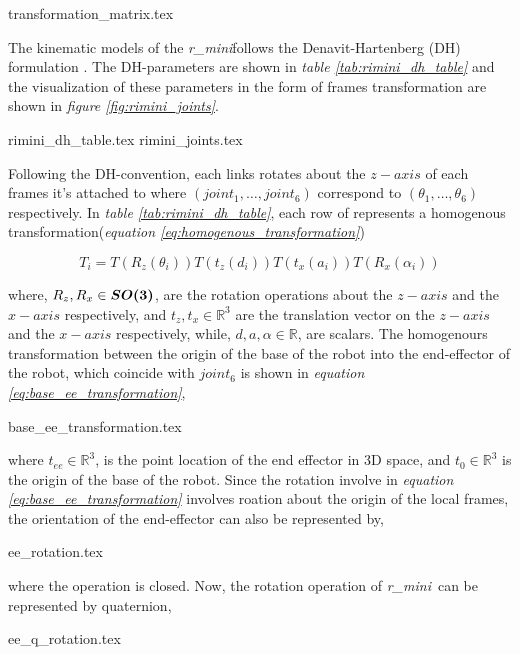 \documentclass[a4paper, 10pt]{article}
\newcommand\thisPaperDir{/home/asl/version-control/ws_thesis/writing_papers/resampling_planning_in_dynamic_environment}
\numberwithin{equation}{section} %
\newcommand\rimini[0]{\textit{r\_mini}} %
\begin{document}
{transformation_matrix.tex}

The kinematic models of the \rimini follows the Denavit-Hartenberg (DH) 
formulation \parencite{Denavit1955}. The DH-parameters are shown 
in \textit{table \ref{tab:rimini_dh_table}} and the visualization of these
parameters in the form of frames transformation are shown in 
\textit{figure \ref{fig:rimini_joints}}.

{rimini_dh_table.tex}
{rimini_joints.tex}

Following the DH-convention, each links rotates about the $z-axis$ of
each frames it's attached to where $(joint_1, \ldots, joint_6)$
correspond to $(\theta_1, \ldots, \theta_6)$ respectively.
In
\textit{table \ref{tab:rimini_dh_table}}, each row of 
represents a homogenous transformation(\textit{equation \ref{eq:homogenous_transformation}})

\begin{equation}\label{eq:homogenous_transformation}
  T_i = T(R_{z}(\theta_i))T(t_{z}(d_i)) T(t_{x}(a_i)) T(R_{x}(\alpha_i))
\end{equation}

where, $R_z,R_x \in \vb*{SO(3)}$, are the rotation operations 
about the $z-axis$ and the $x-axis$ respectively, and 
$t_z, t_x \in \mathbb{R}^3$ are the translation vector
on the $z-axis$ and the $x-axis$ respectively, 
while, $d,a,\alpha \in \mathbb{R}$, are scalars. 
The homogenours transformation between the origin
of the base of the robot into the end-effector of the 
robot, which coincide with $joint_6$ is shown in
\textit{equation \ref{eq:base_ee_transformation}},

{base_ee_transformation.tex}

where
$t_{ee} \in \mathbb{R}^3$, is the point location of the 
end effector in 3D space,
and $t_0 \in \mathbb{R}^3$ is the origin of the 
base of the robot. Since the rotation involve 
in \textit{equation \ref{eq:base_ee_transformation}} involves
roation about the origin of the local frames,
the orientation of the end-effector can also be represented by,

{ee_rotation.tex}

where the operation is closed. Now, the rotation operation
of \rimini \    can be represented by quaternion,

{ee_q_rotation.tex}
\end{document}
